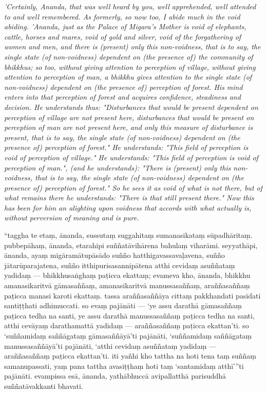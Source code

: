 \documentclass[12pt]{book}
\begin{document}
\begin{paracol}{2}
\begin{column}
{\itshape\footnotesize 'Certainly, Ananda, that was well heard by you, well apprehended, well attended to and well remembered. As formerly, so now too, I abide much in the void abiding. 'Ananda, just as the Palace of Migara's Mother is void of elephants, cattle, horses and mares, void of gold and silver, void of the forgathering of women and men, and there is (present) only this non-voidness, that is to say, the single state (of non-voidness) dependent on (the presence of) the community of bhikkhus; so too, without giving attention to perception of village, without giving attention to perception of man, a bhikkhu gives attention to the single state (of non-voidness) dependent on (the presence of) perception of forest. His mind enters into that perception of forest and acquires confidence, steadiness and decision. He understands thus: "Disturbances that would be present dependent on perception of village are not present here, disturbances that would be present on perception of man are not present here, and only this measure of disturbance is present, that is to say, the single state (of non-voidness) dependent on (the presence of) perception of forest." He understands: "This field of perception is void of perception of village." He understands: "This field of perception is void of perception of man.", (and he understands): "There is (present) only this non-voidness, that is to say, the single state (of non-voidness) dependent on (the presence of) perception of forest." So he sees it as void of what is not there, but of what remains there he understands: "There is that still present there." Now this has been for him an alighting upon voidness that accords with what actually is, without perversion of meaning and is pure.}

\switchcolumn
	\begin{flushleft}
“taggha te etaṃ, ānanda, sussutaṃ suggahitaṃ sumanasikataṃ sūpadhāritaṃ. pubbepāhaṃ, ānanda, etarahipi suññatāvihārena bahulaṃ viharāmi. seyyathāpi, ānanda, ayaṃ migāramātupāsādo suñño hatthigavassavaḷavena, suñño jātarūparajatena, suñño itthipurisasannipātena atthi cevidaṃ asuññataṃ yadidaṃ — bhikkhusaṅghaṃ paṭicca ekattaṃ; evameva kho, ānanda, bhikkhu amanasikaritvā gāmasaññaṃ, amanasikaritvā manussasaññaṃ, araññasaññaṃ paṭicca manasi karoti ekattaṃ. tassa araññasaññāya cittaṃ pakkhandati pasīdati santiṭṭhati adhimuccati. so evaṃ pajānāti — ‘ye assu darathā gāmasaññaṃ paṭicca tedha na santi, ye assu darathā manussasaññaṃ paṭicca tedha na santi, atthi cevāyaṃ darathamattā yadidaṃ — araññasaññaṃ paṭicca ekattan’ti. so ‘suññamidaṃ saññāgataṃ gāmasaññāyā’ti pajānāti, ‘suññamidaṃ saññāgataṃ manussasaññāyā’ti pajānāti, ‘atthi cevidaṃ asuññataṃ yadidaṃ — araññasaññaṃ paṭicca ekattan’ti. iti yañhi kho tattha na hoti tena taṃ suññaṃ samanupassati, yaṃ pana tattha avasiṭṭhaṃ hoti taṃ ‘santamidaṃ atthī’”ti pajānāti. evampissa esā, ānanda, yathābhuccā avipallatthā parisuddhā suññatāvakkanti bhavati.


\end{flushleft}
\end{column}
\end{paracol}
\end{document}
